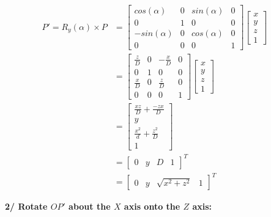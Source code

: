 \documentclass[a4paper,10pt]{article}
\begin{document}
\begin{equation}
\left.\begin{aligned}
P' = R_y(\alpha) \times P 
&=
\begin{bmatrix}
	cos(\alpha)  & 0 & sin(\alpha) & 0 \\
	0 			 & 1 & 0		   & 0 \\
	-sin(\alpha) & 0 & cos(\alpha) & 0 \\
	0 			 & 0 & 0 		   & 1
\end{bmatrix}
\begin{bmatrix}
x \\ y \\ z \\ 1
\end{bmatrix}&\\
&=
\begin{bmatrix}
	\frac{z}{D}  & 0 & -\frac{x}{D} & 0 \\
	0 			 & 1 & 0		    & 0 \\
	\frac{x}{D}  & 0 & \frac{z}{D}  & 0 \\
	0 			 & 0 & 0 		    & 1
\end{bmatrix}
\begin{bmatrix}
x \\ y \\ z \\ 1
\end{bmatrix}&\\
&=
\begin{bmatrix}
\frac{xz}{D} + \frac{-zx}{D} \\
 y \\ 
 \frac{x^2}{d} + \frac{z^2}{D} \\ 
 1
\end{bmatrix}&\\
&=
\begin{bmatrix}
0 & y & D & 1
\end{bmatrix}^{T}&\\
&=
\begin{bmatrix}
0 & y & \sqrt{x^2 + z^2} & 1
\end{bmatrix}^{T}&\
\end{aligned}\right.
\end{equation}


\pagebreak
\noindent
\textbf{2/ Rotate $OP'$ about the $X$ axis onto the $Z$ axis:}


\end{document}
